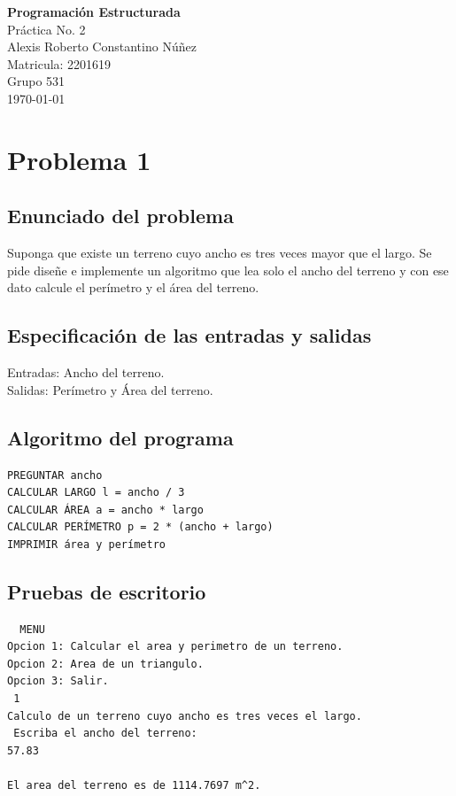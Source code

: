 \documentclass[12pt]{article}
\begin{document}
\begin{titlepage}
    \centering
    \vspace*{4cm}
    
    {\Large \textbf{Programación Estructurada}}\\[1cm]
    {\large Práctica No. 2}\\[2cm]
    
    {\large Alexis Roberto Constantino Núñez}\\
		
    {\large Matricula: 2201619}\\
    {\large Grupo 531}\\[1cm]
    
    {\large \today}
\end{titlepage}

\section{Problema 1}

\subsection{Enunciado del problema}
Suponga que existe un terreno cuyo ancho es tres veces mayor que el largo. Se pide
diseñe e implemente un algoritmo que lea solo el ancho del terreno y con ese dato
calcule el perímetro y el área del terreno.
\subsection{Especificación de las entradas y salidas}
Entradas: Ancho del terreno.\\
Salidas: Perímetro y Área del terreno.
\subsection{Algoritmo del programa}
\begin{verbatim}
PREGUNTAR ancho
CALCULAR LARGO l = ancho / 3
CALCULAR ÁREA a = ancho * largo
CALCULAR PERÍMETRO p = 2 * (ancho + largo)
IMPRIMIR área y perímetro
\end{verbatim}
\subsection{Pruebas de escritorio }
\begin{verbatim}
  MENU
Opcion 1: Calcular el area y perimetro de un terreno.
Opcion 2: Area de un triangulo.
Opcion 3: Salir.
 1
Calculo de un terreno cuyo ancho es tres veces el largo.
 Escriba el ancho del terreno:
57.83

El area del terreno es de 1114.7697 m^2.                                                       
\end{verbatim}
\end{document}
